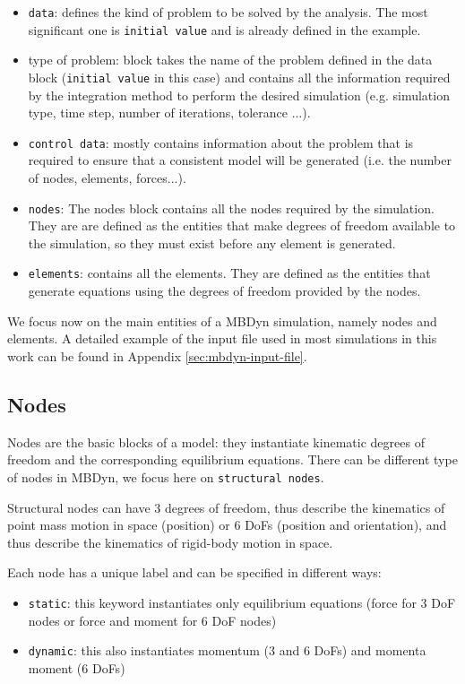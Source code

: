 \begin{itemize}
    \item \texttt{data}: defines the kind of problem to be solved by the analysis. The most significant one is \texttt{initial value} and is already defined in the example. 
    \item type of problem:  block takes the name of the problem defined in the data block (\texttt{initial value} in this case) and contains all the information required by the integration method to perform the desired simulation (e.g. simulation type, time step, number of iterations, tolerance ...).
    \item \texttt{control data}: mostly contains information about the problem that is required to ensure that a consistent model will be generated (i.e. the number of nodes, elements, forces...).
    \item \texttt{nodes}: The nodes block contains all the nodes required by the simulation. They are are defined as the entities that make degrees of freedom available to the simulation, so they must exist before any element is generated.
    \item \texttt{elements}: contains all the elements. They are defined as the entities that generate equations using the degrees of freedom provided by the nodes.
\end{itemize}

We focus now on the main entities of a MBDyn simulation, namely nodes and elements. A detailed example of the input file used in most simulations in this work can be found in Appendix \ref{sec:mbdyn-input-file}.


\subsection{Nodes}
\label{sec:mbd-node}

Nodes are the basic blocks of a model: they instantiate kinematic degrees of freedom and the corresponding equilibrium equations. There can be different type of nodes in MBDyn, we focus here on \texttt{structural nodes}.

Structural nodes can have 3 degrees of freedom, thus describe the kinematics of point mass motion in space  (position) or 6 DoFs (position and orientation), and thus describe the kinematics of rigid-body motion in space.

Each node has a unique label and can be specified in different ways:

\begin{itemize}
	\item \texttt{static}: this keyword instantiates only equilibrium equations (force for 3 DoF nodes or force and moment for 6 DoF nodes)
	\item \texttt{dynamic}: this also instantiates momentum (3 and 6 DoFs) and momenta moment (6 DoFs)
\end{itemize}

